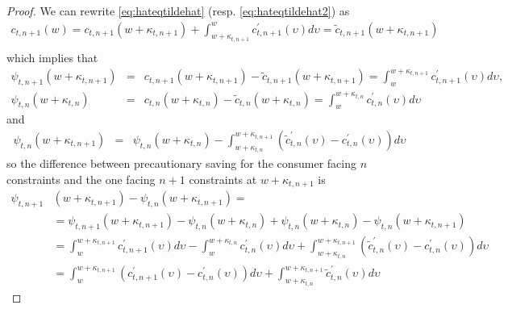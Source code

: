 \begin{proof}
We can rewrite \eqref{eq:hateqtildehat} (resp. \eqref{eq:hateqtildehat2}) as
\begin{eqnarray*}
c_{t,n+1}(w) = c_{t,n+1}({w}+\kappa_{t,n+1})+\int_{{w}+\kappa_{t,n+1}}^{{w}} c_{t,n+1}^{\prime}(\upsilon) d\upsilon  = \tilde{c}_{t,n+1}({w}+\kappa_{t,n+1})
\\ %
\end{eqnarray*}
which implies that
\begin{eqnarray*}
\psi_{t,n+1}({w}+\kappa_{t,n+1}) & = &
c_{t,n+1}({w}+\kappa_{t,n+1})-\tilde{c}_{t,n+1}({w}+\kappa_{t,n+1}) = \int^{{w}+\kappa_{t,n+1}}_{{w}} c_{t,n+1}^{\prime}(\upsilon) d\upsilon,
\\ %
\psi_{t,n}({w}+\kappa_{t,n}) & = &  c_{t,n}({w}+\kappa_{t,n})-\tilde{c}_{t,n}({w}+\kappa_{t,n}) = \int^{{w}+\kappa_{t,n}}_{{w}} c_{t,n}^{\prime}(\upsilon) d\upsilon
\end{eqnarray*}
and
\begin{eqnarray}
 \psi_{t,n}({w}+\kappa_{t,n+1}) & = &
 \psi_{t,n}({w}+\kappa_{t,n}) - \int^{{w}+\kappa_{t,n+1}}_{{w}+\kappa_{t,n}} (\tilde{c}_{t,n}^{\prime}(\upsilon)-c_{t,n}^{\prime}(\upsilon)) d\upsilon \nonumber
\end{eqnarray}
so the difference between precautionary saving for the consumer facing $n$ constraints and the one facing $n+1$ constraints at ${w}+\kappa_{t,n+1}$ is
\begin{align}
\psi_{t,n+1}&({w}+\kappa_{t,n+1}) - \psi_{t,n}({w}+\kappa_{t,n+1}) = \nonumber\\
&= \psi_{t,n+1}({w}+\kappa_{t,n+1}) - \psi_{t,n}({w}+\kappa_{t,n}) + \psi_{t,n}({w}+\kappa_{t,n})- \psi_{t,n}({w}+\kappa_{t,n+1}) \nonumber
\\ &=\int_{{w}}^{{w}+\kappa_{t,n+1}} c_{t,n+1}^{\prime}(\upsilon)d\upsilon - \int^{{w}+\kappa_{t,n}}_{{w}} c_{t,n}^{\prime}(\upsilon) d\upsilon + \int^{{w}+\kappa_{t,n+1}}_{{w}+\kappa_{t,n}} (\tilde{c}_{t,n}^{\prime}(\upsilon)-c_{t,n}^{\prime}(\upsilon)) d\upsilon \nonumber\\
&= \int_{{w}}^{{w}+\kappa_{t,n+1}}
(c_{t,n+1}^{\prime}(\upsilon)-c_{t,n}^{\prime}(\upsilon))d\upsilon +\int^{{w}+\kappa_{t,n+1}}_{{w}+\kappa_{t,n}}
\tilde{c}_{t,n}^{\prime}(\upsilon) d\upsilon \label{eq:psidiffint}
\end{align}



\end{proof}

